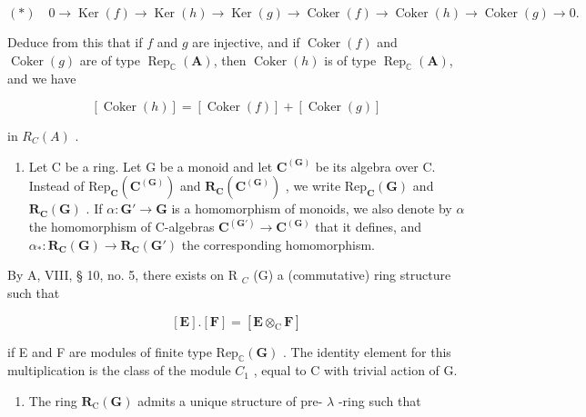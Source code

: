 \[
(*) \quad 0 \rightarrow \operatorname{Ker} (f) \rightarrow \operatorname{Ker} (h) \rightarrow \operatorname{Ker} (g) \rightarrow \operatorname{Coker} (f) \rightarrow \operatorname{Coker} (h) \rightarrow \operatorname{Coker} (g) \rightarrow 0.
\]

Deduce from this that if \(f\) and \(g\) are injective, and if \(\operatorname{Coker}(f)\) and \(\operatorname{Coker}(g)\) are of type \(\operatorname{Rep}_{\mathbb{C}}(\mathbf{A})\), then \(\operatorname{Coker}(h)\) is of type \(\operatorname{Rep}_{\mathbb{C}}(\mathbf{A})\), and we have

\[
[ \operatorname{Coker} (h) ] = [ \operatorname{Coker} (f) ] + [ \operatorname{Coker} (g) ]
\]

in \(R_{C}(A)\) .

\begin{enumerate}
\def\labelenumi{\arabic{enumi})}
\setcounter{enumi}{54}
\tightlist
\item
  Let C be a ring. Let G be a monoid and let \(\mathbf{C}^{(\mathbf{G})}\) be its algebra over C. Instead of \(\mathrm{Rep}_{\mathbf{C}}(\mathbf{C}^{(\mathbf{G})})\) and \(\mathbf{R}_{\mathbf{C}}(\mathbf{C}^{(\mathbf{G})})\) , we write \(\mathrm{Rep}_{\mathbf{C}}(\mathbf{G})\) and \(\mathbf{R}_{\mathbf{C}}(\mathbf{G})\) . If \(\alpha : \mathbf{G}' \to \mathbf{G}\) is a homomorphism of monoids, we also denote by \(\alpha\) the homomorphism of C-algebras \(\mathbf{C}^{(\mathbf{G}')} \to \mathbf{C}^{(\mathbf{G})}\) that it defines, and \(\alpha_{*}: \mathbf{R}_{\mathbf{C}}(\mathbf{G}) \to \mathbf{R}_{\mathbf{C}}(\mathbf{G}')\) the corresponding homomorphism.
\end{enumerate}

By A, VIII, § 10, no. 5, there exists on R \(_{C}\) (G) a (commutative) ring structure such that

\[
[ \mathbf {E} ]. [ \mathbf {F} ] = [ \mathbf {E} \otimes_ {\mathrm{C}} \mathbf {F} ]
\]

if E and F are modules of finite type \(\mathrm{Rep}_{\mathbb{C}}(\mathbf{G})\) . The identity element for this multiplication is the class of the module \(C_1\) , equal to C with trivial action of G.

\begin{enumerate}
\def\labelenumi{\alph{enumi})}
\tightlist
\item
  The ring \(\mathbf{R}_{\mathrm{C}}(\mathbf{G})\) admits a unique structure of pre- \(\lambda\) -ring such that
\end{enumerate}

